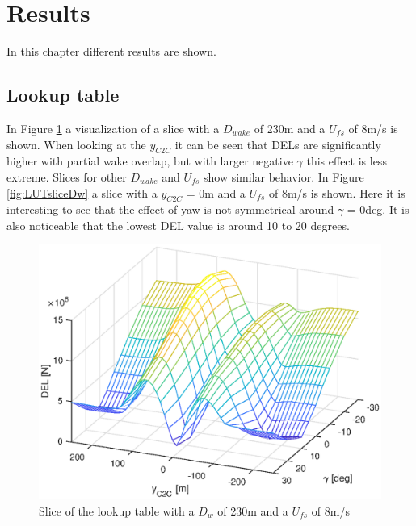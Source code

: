 \section{Results}

In this chapter different results are shown.

\subsection{Lookup table}
In Figure \ref{fig:LUTsliceC2C} a visualization of a slice with a $D_{wake}$ of 230m and a $U_{fs}$ of 8m/s is shown. When looking at the $y_{C2C}$ it can be seen that DELs are significantly higher with partial wake overlap, but with larger negative $\gamma$ this effect is less extreme. Slices for other $D_{wake}$ and $U_{fs}$ show similar behavior. In Figure \ref{fig:LUTsliceDw} a slice with a $y_{C2C}$ = 0m and a $U_{fs}$ of 8m/s is shown. Here it is interesting to see that the effect of yaw is not symmetrical around $\gamma$ = 0deg. It is also noticeable that the lowest DEL value is around 10 to 20 degrees.  

\begin{figure}
	\includegraphics[width=\linewidth]{./Figures/LUTslice_Dw230_Ufs8.eps}
	\caption{Slice of the lookup table with a $D_{w}$ of 230m and a $U_{fs}$ of 8m/s }
	\label{fig:LUTsliceC2C}
\end{figure}

